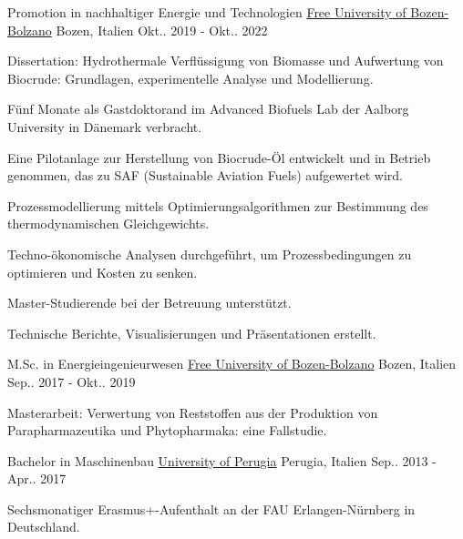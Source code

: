 
\begin{cventries}

\cventry
{Promotion in nachhaltiger Energie und Technologien}
{\href{https://unibz.it}{Free University of Bozen-Bolzano}}
{Bozen, Italien}
{Okt.. 2019 - Okt.. 2022}
{\begin{cvitems}
\item {Dissertation: Hydrothermale Verflüssigung von Biomasse und Aufwertung von Biocrude: Grundlagen, experimentelle Analyse und Modellierung.}
\item {Fünf Monate als Gastdoktorand im Advanced Biofuels Lab der Aalborg University in Dänemark verbracht.}
\item {Eine Pilotanlage zur Herstellung von Biocrude-Öl entwickelt und in Betrieb genommen, das zu SAF (Sustainable Aviation Fuels) aufgewertet wird.}
\item {Prozessmodellierung mittels Optimierungsalgorithmen zur Bestimmung des thermodynamischen Gleichgewichts.}
\item {Techno-ökonomische Analysen durchgeführt, um Prozessbedingungen zu optimieren und Kosten zu senken.}
\item {Master-Studierende bei der Betreuung unterstützt.}
\item {Technische Berichte, Visualisierungen und Präsentationen erstellt.}
\end{cvitems}}

\cventry
{M.Sc. in Energieingenieurwesen}
{\href{https://unibz.it}{Free University of Bozen-Bolzano}}
{Bozen, Italien}
{Sep.. 2017 - Okt.. 2019}
{\begin{cvitems}
\item {Masterarbeit: Verwertung von Reststoffen aus der Produktion von Parapharmazeutika und Phytopharmaka: eine Fallstudie.}
\end{cvitems}}

\cventry
{Bachelor in Maschinenbau}
{\href{https://unipg.it}{University of Perugia}}
{Perugia, Italien}
{Sep.. 2013 - Apr.. 2017}
{\begin{cvitems}
\item {Sechsmonatiger Erasmus+-Aufenthalt an der FAU Erlangen-Nürnberg in Deutschland.}
\end{cvitems}}

\end{cventries}